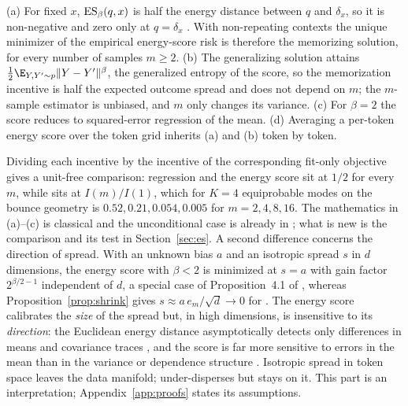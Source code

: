\begin{proposition}
\label{prop:es}
(a) For fixed $x$, $\mathrm{ES}_\beta(q, x)$ is half the energy distance between $q$ and $\delta_x$, so it is non-negative and zero only at $q = \delta_x$ \citep{dawid2007geometry,gneiting2007strictly}. With non-repeating contexts the unique minimizer of the empirical energy-score risk is therefore the memorizing solution, for every number of samples $m \ge 2$. (b) The generalizing solution attains $\frac{1}{2}\E_{Y, Y' \sim p}\|Y - Y'\|^\beta$, the generalized entropy of the score, so the memorization incentive is half the expected outcome spread and does not depend on $m$; the $m$-sample estimator is unbiased, and $m$ only changes its variance. (c) For $\beta = 2$ the score reduces to squared-error regression of the mean. (d) Averaging a per-token energy score over the token grid inherits (a) and (b) token by token.
\end{proposition}

Dividing each incentive by the incentive of the corresponding fit-only objective gives a unit-free comparison: regression and the energy score sit at $1/2$ for every $m$, while \nom{} sits at $I(m)/I(1)$, which for $K{=}4$ equiprobable modes on the bounce geometry is $0.52, 0.21, 0.054, 0.005$ for $m = 2, 4, 8, 16$. The mathematics in (a)--(c) is classical and the unconditional case is already in \citet{li2018imle}; what is new is the comparison and its test in Section~\ref{sec:es}. A second difference concerns the direction of spread. With an unknown bias $a$ and an isotropic spread $s$ in $d$ dimensions, the energy score with $\beta < 2$ is minimized at $s = a$ with gain factor $2^{\beta/2 - 1}$ independent of $d$, a special case of Proposition~4.1 of \citet{debortoli2025distributional}, whereas Proposition~\ref{prop:shrink} gives $s \approx a\, e_m/\sqrt{d} \to 0$ for \nom{}. The energy score calibrates the \emph{size} of the spread but, in high dimensions, is insensitive to its \emph{direction}: the Euclidean energy distance asymptotically detects only differences in means and covariance traces \citep{chakraborty2021framework}, and the score is far more sensitive to errors in the mean than in the variance or dependence structure \citep{pinson2013discrimination,scheuerer2015variogram,marcotte2023regions}. Isotropic spread in token space leaves the data manifold; \nom{} under-disperses but stays on it. This part is an interpretation; Appendix~\ref{app:proofs} states its assumptions.

